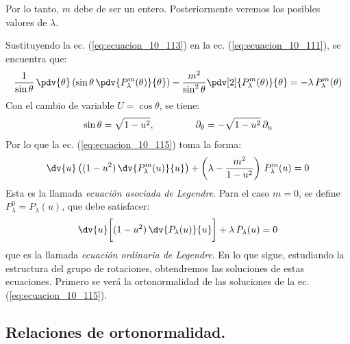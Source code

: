Por lo tanto, $m$ debe de ser un entero. Posteriormente veremos los posibles valores de $\lambda$.
\par
Sustituyendo la ec. (\ref{eq:ecuacion_10_113}) en la ec. (\ref{eq:ecuacion_10_111}), se encuentra que:
\begin{align}
\dfrac{1}{\sin \theta} \, \pdv{\theta} \left( \sin \theta \, \pdv{P_{\lambda}^{m} (\theta)}{\theta} \right) - \dfrac{m^{2}}{\sin^{2} \theta} \pdv[2]{P_{\lambda}^{m} (\theta)}{\theta} = - \lambda \, P_{\lambda}^{m} (\theta) \label{eq:ecuacion_10_115}
\end{align}
Con el cambio de variable $U = \cos \theta$, se tiene:
\begin{align}
\sin \theta = \sqrt{1 - u^{2}}, \hspace{1.5cm} \partial_{\theta} = - \sqrt{1 - u^{2}} \, \partial_{u}
\label{eq:ecuacion_10_116}
\end{align}
Por lo que la ec. (\ref{eq:ecuacion_10_115}) toma la forma:
\begin{align}
\dv{u} \left( (1 - u^{2}) \, \dv{P_{\lambda}^{m} (u)}{u} \right) + \left( \lambda - \dfrac{m^{2}}{1 - u^{2}} \right) \, P_{\lambda}^{m} (u) = 0
\label{eq:ecuacion_10_117}
\end{align}
Esta es la llamada \emph{ecuación asociada de Legendre}.
 Para el caso $m = 0$, se define $P_{\lambda}^{0} = P_{\lambda} (u)$, que debe satisfacer:
\begin{align}
\dv{u} \bigg[ (1 - u^{2}) \, \dv{P_{\lambda} (u)}{u} \bigg] + \lambda \, P_{\lambda} (u) = 0
\label{eq:ecuacion_10_118}
\end{align}
que es la llamada \emph{ecuación ordinaria de Legendre}. En lo que sigue, estudiando la estructura del grupo de rotaciones, obtendremos las soluciones de estas ecuaciones. Primero se verá la ortonormalidad de las soluciones de la ec. (\ref{eq:ecuacion_10_115}).

\subsection{Relaciones de ortonormalidad.}

